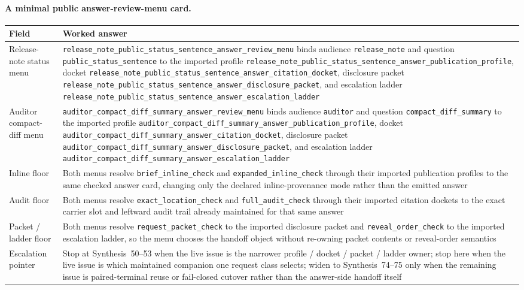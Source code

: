 \documentclass[11pt]{article}
\begin{document}
\paragraph{A minimal public answer-review-menu card.}
\begin{table}[t]
\centering
\small
\begin{tabularx}{\linewidth}{@{}lX@{}}
\toprule
Field & Worked answer \\
\midrule
Release-note status menu & \nolinkurl{release_note_public_status_sentence_answer_review_menu} binds audience \texttt{release\_note} and question \texttt{public\_status\_sentence} to the imported profile \nolinkurl{release_note_public_status_sentence_answer_publication_profile}, docket \nolinkurl{release_note_public_status_sentence_answer_citation_docket}, disclosure packet \nolinkurl{release_note_public_status_sentence_answer_disclosure_packet}, and escalation ladder \nolinkurl{release_note_public_status_sentence_answer_escalation_ladder} \\
Auditor compact-diff menu & \nolinkurl{auditor_compact_diff_summary_answer_review_menu} binds audience \texttt{auditor} and question \texttt{compact\_diff\_summary} to the imported profile \nolinkurl{auditor_compact_diff_summary_answer_publication_profile}, docket \nolinkurl{auditor_compact_diff_summary_answer_citation_docket}, disclosure packet \nolinkurl{auditor_compact_diff_summary_answer_disclosure_packet}, and escalation ladder \nolinkurl{auditor_compact_diff_summary_answer_escalation_ladder} \\
Inline floor & Both menus resolve \nolinkurl{brief_inline_check} and \nolinkurl{expanded_inline_check} through their imported publication profiles to the same checked answer card, changing only the declared inline-provenance mode rather than the emitted answer \\
Audit floor & Both menus resolve \nolinkurl{exact_location_check} and \nolinkurl{full_audit_check} through their imported citation dockets to the exact carrier slot and leftward audit trail already maintained for that same answer \\
Packet / ladder floor & Both menus resolve \nolinkurl{request_packet_check} to the imported disclosure packet and \nolinkurl{reveal_order_check} to the imported escalation ladder, so the menu chooses the handoff object without re-owning packet contents or reveal-order semantics \\
Escalation pointer & Stop at Synthesis~50--53 when the live issue is the narrower profile / docket / packet / ladder owner; stop here when the live issue is which maintained companion one request class selects; widen to Synthesis~74--75 only when the remaining issue is paired-terminal reuse or fail-closed cutover rather than the answer-side handoff itself \\

\end{tabularx}
\end{table}
\end{document}
